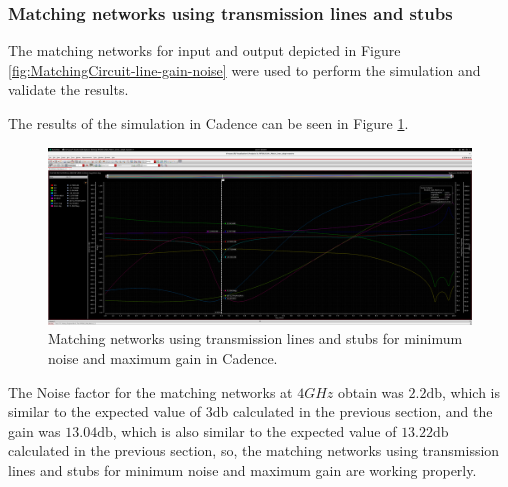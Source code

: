 \subsubsection{Matching networks using transmission lines and stubs}

The matching networks for input and output depicted in Figure \ref{fig:MatchingCircuit-line-gain-noise} were used to perform the simulation and validate the results.

The results of the simulation in Cadence can be seen in Figure \ref{fig:CadenceNoiseGainMatchingCircuitLine}.

\begin{figure}[H]
    \centering
    \includegraphics[width=1\textwidth]{Images/CAD-LinesmatchNoiseGain.png}
    \caption{Matching networks using transmission lines and stubs for minimum noise and maximum gain in Cadence.}
    \label{fig:CadenceNoiseGainMatchingCircuitLine}
\end{figure}

The Noise factor for the matching networks at $4 GHz$ obtain was $2.2 \si{\decibel}$, which is similar to the expected value of $3 \si{\decibel}$ calculated in the previous section, and the gain was $13.04 \si{\decibel}$, which is also similar to the expected value of $13.22 \si{\decibel}$ calculated in the previous section, so, the matching networks using transmission lines and stubs for minimum noise and maximum gain are working properly.